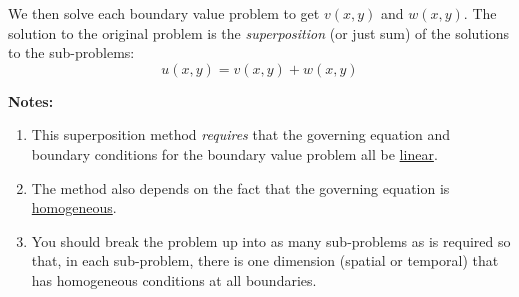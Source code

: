 \vspace{0.25cm}


\noindent We then solve each boundary value problem to get $v(x,y)$ and $w(x,y)$.  The solution to the original problem is the \emph{superposition} (or just sum) of the solutions to the sub-problems:
\begin{equation*}
u(x,y) = v(x,y) + w(x,y)
\end{equation*}

\vspace{0.25cm}

\noindent\textbf{Notes:}

\begin{enumerate}
\item This superposition method \emph{requires} that the governing equation and boundary conditions for the boundary value problem all be \underline{linear}.  
\item The method also depends on the fact that the governing equation is \underline{homogeneous}.
\item You should break the problem up into as many sub-problems as is required so that, in each sub-problem, there is one dimension (spatial or temporal) that has homogeneous conditions at all boundaries.
\end{enumerate}
